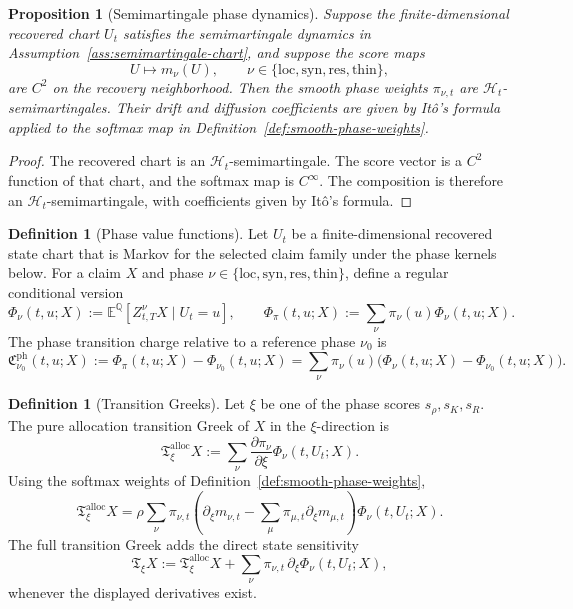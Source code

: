 \documentclass[11pt,a4paper]{amsart}
\theoremstyle{plain}
\newtheorem{proposition}[theorem]{Proposition}
\theoremstyle{definition}
\newtheorem{definition}[theorem]{Definition}
\theoremstyle{remark}
\newcommand{\QQ}{\mathbb{Q}}
\newcommand{\EE}{\mathbb{E}}
\newcommand{\cH}{\mathcal{H}}
\begin{document}
\begin{proposition}[Semimartingale phase dynamics]\label{prop:semimartingale-phase-dynamics}
Suppose the finite-dimensional recovered chart \(U_t\) satisfies the semimartingale dynamics in
Assumption~\ref{ass:semimartingale-chart}, and suppose the score maps
\[
        U\mapsto m_{\nu}(U),
        \qquad
        \nu\in\{\mathrm{loc},\mathrm{syn},\mathrm{res},\mathrm{thin}\},
\]
are \(C^2\) on the recovery neighborhood.  Then the smooth phase weights
\(\pi_{\nu,t}\) are \(\cH_t\)-semimartingales.  Their drift and diffusion coefficients are given
by It\^o's formula applied to the softmax map in Definition~\ref{def:smooth-phase-weights}.
\end{proposition}

\begin{proof}
The recovered chart is an \(\cH_t\)-semimartingale.  The score vector is a \(C^2\) function of
that chart, and the softmax map is \(C^\infty\).  The composition is therefore an
\(\cH_t\)-semimartingale, with coefficients given by It\^o's formula.
\end{proof}

\begin{definition}[Phase value functions]\label{def:phase-value-functions}
Let \(U_t\) be a finite-dimensional recovered state chart that is Markov for the selected claim
family under the phase kernels below.  For a claim \(X\) and phase
\(\nu\in\{\mathrm{loc},\mathrm{syn},\mathrm{res},\mathrm{thin}\}\), define a regular conditional
version
\[
        \Phi_\nu(t,u;X)
        :=
        \EE^\QQ[Z_{t,T}^{\nu}X\mid U_t=u],
        \qquad
        \Phi_\pi(t,u;X)
        :=
        \sum_\nu \pi_\nu(u)\Phi_\nu(t,u;X).
\]
The phase transition charge relative to a reference phase \(\nu_0\) is
\[
        \mathfrak C_{\nu_0}^{\mathrm{ph}}(t,u;X)
        :=
        \Phi_\pi(t,u;X)-\Phi_{\nu_0}(t,u;X)
        =
        \sum_\nu \pi_\nu(u)\bigl(\Phi_\nu(t,u;X)-\Phi_{\nu_0}(t,u;X)\bigr).
\]
\end{definition}

\begin{definition}[Transition Greeks]\label{def:transition-greeks}
Let \(\xi\) be one of the phase scores \(s_\rho,s_K,s_R\).  The pure allocation transition
Greek of \(X\) in the \(\xi\)-direction is
\[
        \mathfrak T_{\xi}^{\mathrm{alloc}}X
        :=
        \sum_\nu
        \frac{\partial \pi_\nu}{\partial \xi}
        \Phi_\nu(t,U_t;X).
\]
Using the softmax weights of Definition~\ref{def:smooth-phase-weights},
\[
        \mathfrak T_{\xi}^{\mathrm{alloc}}X
        =
        \rho
        \sum_\nu
        \pi_{\nu,t}
        \left(
        \partial_\xi m_{\nu,t}
        -
        \sum_\mu\pi_{\mu,t}\partial_\xi m_{\mu,t}
        \right)
        \Phi_\nu(t,U_t;X).
\]
The full transition Greek adds the direct state sensitivity
\[
        \mathfrak T_\xi X
        :=
        \mathfrak T_{\xi}^{\mathrm{alloc}}X
        +
        \sum_\nu \pi_{\nu,t}\,\partial_\xi\Phi_\nu(t,U_t;X),
\]
whenever the displayed derivatives exist.
\end{definition}
\end{document}
